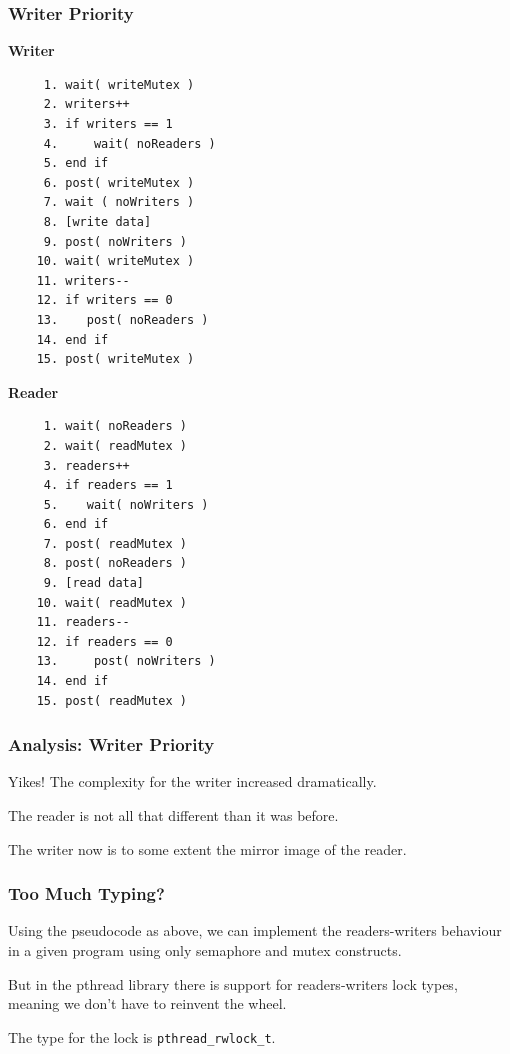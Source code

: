 \begin{frame}[fragile]
\frametitle{Writer Priority}

\begin{multicols}{2}
\textbf{Writer}\vspace{-1em}
  \begin{verbatim}
     1. wait( writeMutex )
     2. writers++
     3. if writers == 1
     4.     wait( noReaders )
     5. end if
     6. post( writeMutex )
     7. wait ( noWriters )
     8. [write data]
     9. post( noWriters ) 
    10. wait( writeMutex )
    11. writers--
    12. if writers == 0
    13.    post( noReaders )
    14. end if
    15. post( writeMutex )     
  \end{verbatim}
\columnbreak
\textbf{Reader}\vspace{-2em}
  \begin{verbatim}
     1. wait( noReaders )
     2. wait( readMutex )
     3. readers++
     4. if readers == 1
     5.    wait( noWriters )
     6. end if
     7. post( readMutex )
     8. post( noReaders )
     9. [read data]
    10. wait( readMutex )
    11. readers--
    12. if readers == 0
    13.     post( noWriters )
    14. end if
    15. post( readMutex )
\end{verbatim}
\end{multicols}
\vspace{-2em}

\end{frame}


\begin{frame}
\frametitle{Analysis: Writer Priority}

Yikes! The complexity for the writer increased dramatically. 

The reader is not all that different than it was before.

The writer now is to some extent the mirror image of the reader. 

\end{frame}


\begin{frame}
\frametitle{Too Much Typing?}

Using the pseudocode as above, we can implement the readers-writers behaviour in a given program using only semaphore and mutex constructs.

But in the pthread library there is support for readers-writers lock types, meaning we don't have to reinvent the wheel.

The type for the lock is \texttt{pthread\_rwlock\_t}. 

\end{frame}


